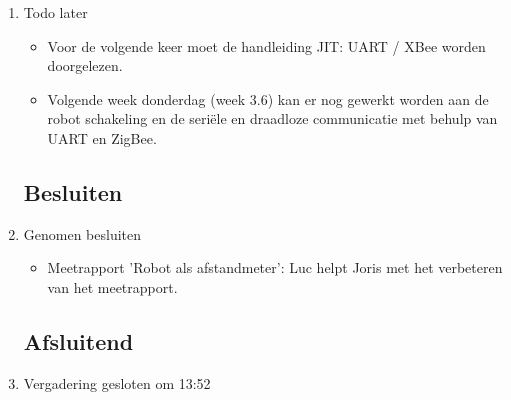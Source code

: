 \documentclass{article}
\begin{document}
\begin{enumerate}
\item Todo later
\begin{itemize}
\item Voor de volgende keer moet de handleiding JIT: UART / XBee worden doorgelezen.
\item Volgende week donderdag (week 3.6) kan er nog gewerkt worden aan de robot schakeling en de seriële en draadloze communicatie met behulp van UART en ZigBee. 
\end{itemize}

\subsection*{Besluiten}
\item Genomen besluiten
\begin{itemize}
\item Meetrapport 'Robot als afstandmeter': Luc helpt Joris met het verbeteren van het meetrapport.
\end{itemize}

\noindent 
\subsection*{Afsluitend}
\item Vergadering gesloten om 13:52

\end{enumerate}
\end{document}
